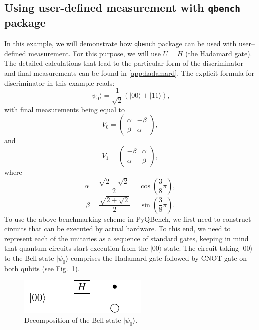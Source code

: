 \documentclass[preprint,12pt, a4paper, dvipsnames]{elsarticle}
\newcommand{\ket}[1]{\ensuremath{|#1\rangle}}
\newcommand{\1}{{\rm 1\hspace{-0.9mm}l}}
\theoremstyle{definition}
\begin{document}
\subsection{Using user-defined measurement with \texttt{qbench} package}
In this example, we will demonstrate how \texttt{qbench} package can be used with user--defined
measurement. For this purpose, we will use $U = H$ (the Hadamard gate). The detailed calculations
that lead to the particular form of the discriminator and final measurements can be found in
\ref{app:hadamard}.
\noindent
The explicit formula for discriminator in this example reads:
\begin{equation}
\ket{\psi_0} = \frac{1}{\sqrt{2}} (\ket{00} + \ket{11}),
\end{equation}
with final measurements being equal to
\begin{equation}
V_0 =
\left(\begin{array}{cc} \alpha & -\beta\\ \beta & \alpha \end{array}\right),
\end{equation}
and \begin{equation}
V_1 =
\left(\begin{array}{cc} -\beta & \alpha \\ \alpha & \beta \end{array}\right),
\end{equation}
where \begin{equation}
\alpha = \frac{\sqrt{2 - \sqrt{2}}}{2} = \cos\left( \frac{3}{8} \pi \right),
\end{equation}
\begin{equation}
\beta  = \frac{\sqrt{2  + \sqrt{2}}}{2} = \sin\left( \frac{3}{8} \pi \right).
\end{equation}
To use the above benchmarking scheme in PyQBench, we first need to construct circuits that can be executed by actual hardware. To this end, we need to represent each of the unitaries as a sequence of standard gates, keeping in mind that quantum circuits start execution from the  $\ket{00}$ state. The circuit taking $\ket{00}$ to the Bell state $\ket{\psi_0}$  comprises the Hadamard gate followed by CNOT gate on both qubits (see Fig.~\ref{fig:discriminator}).
\begin{figure}[h!]
	\centering
	\includegraphics[scale=1.7]{pics/discriminator}
	\caption{Decomposition of the Bell state $\ket{\psi_0}$. }
	\label{fig:discriminator}
\end{figure}
\end{document}
